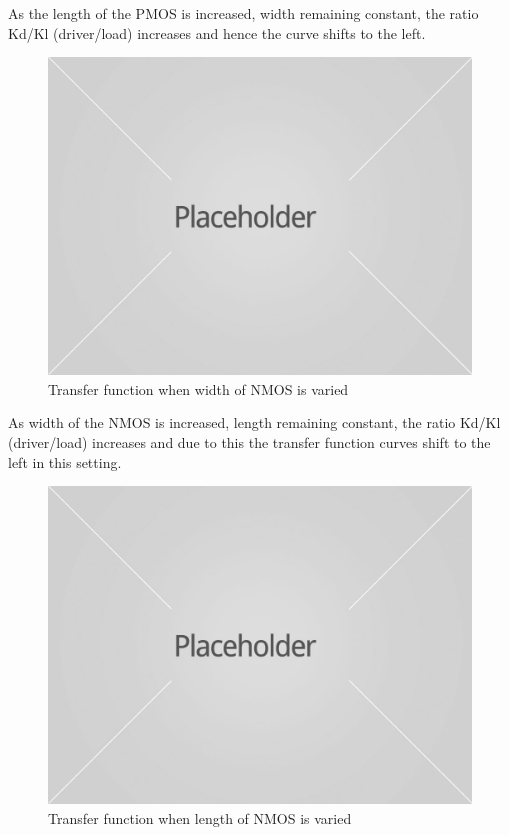 \documentclass[12pt,a4paper]{article}
\begin{document}
As the length of the PMOS is increased, width remaining constant, the ratio Kd/Kl (driver/load) increases and hence the curve shifts to the left.

\begin{figure}[H]
\begin{center}
\includegraphics[scale=0.20]{placeholder.jpg}
\caption{Transfer function when width of NMOS is varied}
\end{center}
\end{figure}

As width of the NMOS is increased, length remaining constant, the ratio Kd/Kl (driver/load) increases and due to this the transfer function curves shift to the left in this setting. 

\begin{figure}[H]
\begin{center}
\includegraphics[scale=0.20]{placeholder.jpg}
\caption{Transfer function when length of NMOS is varied}
\end{center}
\end{figure}
\end{document}
